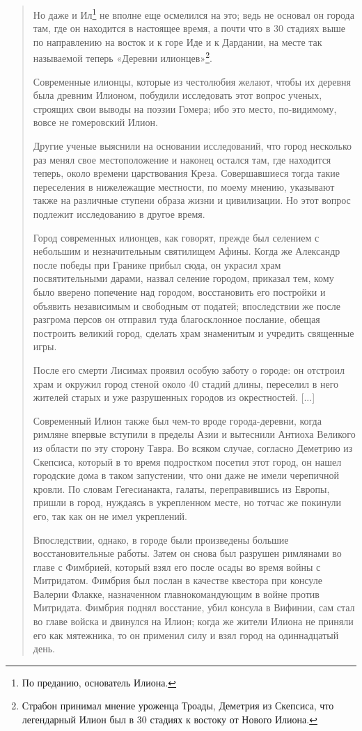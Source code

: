 \begin{quotation}
Но даже и Ил\footnote{По преданию, основатель Илиона.} не вполне еще осмелился на это; ведь не основал он города там, где он находится в настоящее время, а почти что в 30 стадиях выше по направлению на восток и к горе Иде и к Дардании, на месте так называемой теперь «Деревни илионцев»\footnote{Страбон принимал мнение уроженца Троады, Деметрия из Скепсиса, что легендарный Илион был в 30 стадиях к востоку от Нового Илиона.}.

Современные илионцы, которые из честолюбия желают, чтобы их деревня была древним Илионом, побудили исследовать этот вопрос ученых, строящих свои выводы на поэзии Гомера; ибо это место, по-видимому, вовсе не гомеровский Илион. 

Другие ученые выяснили на основании исследований, что город несколько раз менял свое местоположение и наконец остался там, где находится теперь, около времени царствования Креза. Совершавшиеся тогда такие переселения в нижележащие местности, по моему мнению, указывают также на различные ступени образа жизни и цивилизации. Но этот вопрос подлежит исследованию в другое время.

Город современных илионцев, как говорят, прежде был селением с небольшим и незначительным святилищем Афины. Когда же Александр после победы при Гранике прибыл сюда, он украсил храм посвятительными дарами, назвал селение городом, приказал тем, кому было вверено попечение над городом, восстановить его постройки и объявить независимым и свободным от податей; впоследствии же после разгрома персов он отправил туда благосклонное послание, обещая построить великий город, сделать храм знаменитым и учредить священные игры.

После его смерти Лисимах проявил особую заботу о городе: он отстроил храм и окружил город стеной около 40 стадий длины, переселил в него жителей старых и уже разрушенных городов из окрестностей. [...]

Современный Илион также был чем-то вроде города-деревни, когда римляне впервые вступили в пределы Азии и вытеснили Антиоха Великого из области по эту сторону Тавра. Во всяком случае, согласно Деметрию из Скепсиса, который в то время подростком посетил этот город, он нашел городские дома в таком запустении, что они даже не имели черепичной кровли. По словам Гегесианакта, галаты, переправившись из Европы, пришли в город, нуждаясь в укрепленном месте, но тотчас же покинули его, так как он не имел укреплений.

Впоследствии, однако, в городе были произведены большие восстановительные работы. Затем он снова был разрушен римлянами во главе с Фимбрией, который взял его после осады во время войны с Митридатом. Фимбрия был послан в качестве квестора при консуле Валерии Флакке, назначенном главнокомандующим в войне против Митридата. Фимбрия поднял восстание, убил консула в Вифинии, сам стал во главе войска и двинулся на Илион; когда же жители Илиона не приняли его как мятежника, то он применил силу и взял город на одиннадцатый день. 


\end{quotation}
